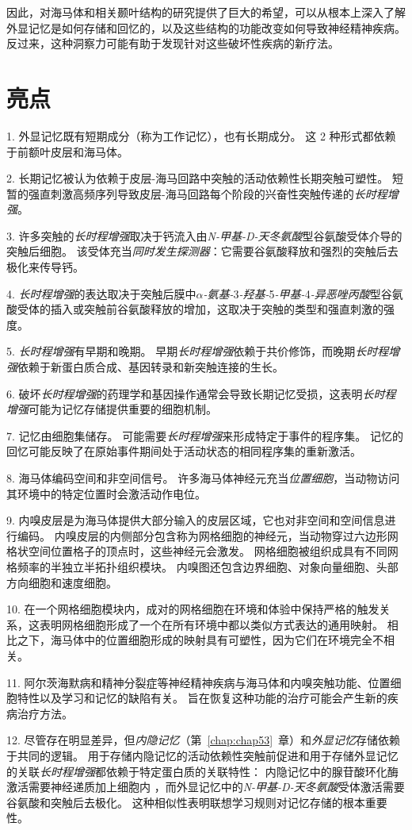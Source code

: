因此，对海马体和相关颞叶结构的研究提供了巨大的希望，可以从根本上深入了解外显记忆是如何存储和回忆的，以及这些结构的功能改变如何导致神经精神疾病。
反过来，这种洞察力可能有助于发现针对这些破坏性疾病的新疗法。



\section{亮点}

1. 外显记忆既有短期成分（称为工作记忆），也有长期成分。
这 2 种形式都依赖于前额叶皮层和海马体。


2. 长期记忆被认为依赖于皮层-海马回路中突触的活动依赖性长期突触可塑性。
短暂的强直刺激高频序列导致皮层-海马回路每个阶段的兴奋性突触传递的\textit{长时程增强}。


3. 许多突触的\textit{长时程增强}取决于钙流入由\textit{N-甲基-D-天冬氨酸}型谷氨酸受体介导的突触后细胞。
该受体充当\textit{同时发生探测器}：它需要谷氨酸释放和强烈的突触后去极化来传导钙。


4. \textit{长时程增强}的表达取决于突触后膜中\textit{$\alpha$-氨基-}3\textit{-羟基-}5\textit{-甲基-}4\textit{-异恶唑丙酸}型谷氨酸受体的插入或突触前谷氨酸释放的增加，这取决于突触的类型和强直刺激的强度。


5. \textit{长时程增强}有早期和晚期。
早期\textit{长时程增强}依赖于共价修饰，而晚期\textit{长时程增强}依赖于新蛋白质合成、基因转录和新突触连接的生长。


6. 破坏\textit{长时程增强}的药理学和基因操作通常会导致长期记忆受损，这表明\textit{长时程增强}可能为记忆存储提供重要的细胞机制。


7. 记忆由细胞集储存。
可能需要\textit{长时程增强}来形成特定于事件的程序集。
记忆的回忆可能反映了在原始事件期间处于活动状态的相同程序集的重新激活。


8. 海马体编码空间和非空间信号。
许多海马体神经元充当\textit{位置细胞}，当动物访问其环境中的特定位置时会激活动作电位。


9. 内嗅皮层是为海马体提供大部分输入的皮层区域，它也对非空间和空间信息进行编码。
内嗅皮层的内侧部分包含称为网格细胞的神经元，当动物穿过六边形网格状空间位置格子的顶点时，这些神经元会激发。
网格细胞被组织成具有不同网格频率的半独立半拓扑组织模块。
内嗅图还包含边界细胞、对象向量细胞、头部方向细胞和速度细胞。


10. 在一个网格细胞模块内，成对的网格细胞在环境和体验中保持严格的触发关系，这表明网格细胞形成了一个在所有环境中都以类似方式表达的通用映射。
相比之下，海马体中的位置细胞形成的映射具有可塑性，因为它们在环境完全不相关。


11. 阿尔茨海默病和精神分裂症等神经精神疾病与海马体和内嗅突触功能、位置细胞特性以及学习和记忆的缺陷有关。
旨在恢复这种功能的治疗可能会产生新的疾病治疗方法。 


12. 尽管存在明显差异，但\textit{内隐记忆}（第~\ref{chap:chap53}~章）和\textit{外显记忆}存储依赖于共同的逻辑。
用于存储内隐记忆的活动依赖性突触前促进和用于存储外显记忆的关联\textit{长时程增强}都依赖于特定蛋白质的关联特性：
内隐记忆中的腺苷酸环化酶激活需要神经递质加上细胞内 ，而外显记忆中的\textit{N-甲基-D-天冬氨酸}受体激活需要谷氨酸和突触后去极化。
这种相似性表明联想学习规则对记忆存储的根本重要性。






